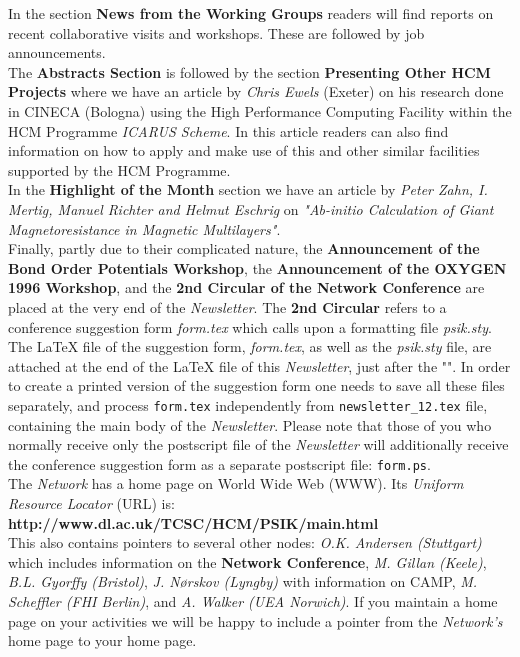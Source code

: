 \ni In the section {\bf News from the Working Groups} readers will find reports on recent 
collaborative visits and workshops. These are followed by job announcements. \\ 

\ni The {\bf Abstracts Section} is followed by the section {\bf Presenting Other HCM Projects} 
where we have an article by {\it Chris Ewels} (Exeter) on his research done in CINECA (Bologna) 
using the High Performance Computing Facility within the HCM Programme {\it ICARUS Scheme}. 
In this article readers can also find information on how to apply and make use of this and other
similar facilities supported by the HCM Programme.\\

\ni In the {\bf Highlight of the Month} section we have an article by 
{\it Peter Zahn, I. Mertig, Manuel Richter and Helmut Eschrig} on {\it "Ab-initio
Calculation of Giant Magnetoresistance in Magnetic Multilayers"}.\\

\ni Finally, partly due to their complicated nature, the {\bf Announcement of the Bond Order Potentials Workshop}, 
the {\bf Announcement of the OXYGEN 1996 Workshop}, and the {\bf 2nd Circular of the Network Conference} 
are placed at the very end of the {\it Newsletter}. The {\bf 2nd Circular} refers to a conference suggestion
form {\it form.tex} which calls upon a formatting file {\it psik.sty}. The LaTeX file of the suggestion form,
{\it form.tex}, as well as the {\it psik.sty} file, are attached at the end of the LaTeX file
of this {\it Newsletter}, just after the "\verb||". In order to create a printed version of the 
suggestion form one needs to save all these files separately, and process \verb|form.tex| independently from 
\verb|newsletter_12.tex| file, containing the main body of the {\it Newsletter}. Please note that those of you who 
normally receive only the postscript file of the {\it Newsletter} will additionally receive the conference suggestion 
form as a separate postscript file: \verb|form.ps|.\\

\vspace{0.5cm}
\ni The {\it Network} has a home page on World Wide Web (WWW). Its {\it Uniform Resource
Locator} (URL) is:\\
{\bf http://www.dl.ac.uk/TCSC/HCM/PSIK/main.html}\\

\ni This also contains pointers to several other nodes: {\it O.K. Andersen (Stuttgart)} which 
includes
information on the {\bf Network Conference}, {\it M. Gillan (Keele)}, {\it B.L. Gyorffy (Bristol)}, 
{\it J. N{\o}rskov (Lyngby)} 
with information on CAMP, {\it M. Scheffler (FHI Berlin)}, and {\it A. Walker (UEA Norwich)}. 
If you maintain a home page on your activities we will be happy to include a pointer from
the {\it Network's} home page to your home page.\\

